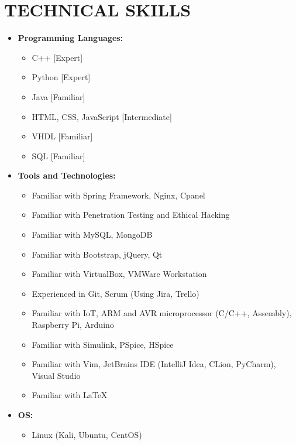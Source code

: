 \section{TECHNICAL SKILLS}
\begin{itemize}
	\item \textbf{Programming Languages:} 
		\begin{itemize}
			\item C++ [Expert]
			\item Python [Expert]
			\item Java [Familiar]
			\item HTML, CSS, JavaScript [Intermediate]
			\item VHDL [Familiar]
			\item SQL [Familiar]
		\end{itemize}
	
	\vspace{+1 em}
	\item \textbf{Tools and Technologies:} 
		\begin{itemize}
			\item Familiar with Spring Framework, Nginx, Cpanel
			\item Familiar with Penetration Testing and Ethical Hacking
			\item Familiar with MySQL, MongoDB
			\item Familiar with Bootstrap, jQuery, Qt
			\item Familiar with VirtualBox, VMWare Workstation
			
			\item Experienced in Git, Scrum (Using Jira, Trello) 
			
			\item Familiar with IoT, ARM and AVR microprocessor (C/C++, Assembly), Raspberry Pi, Arduino
			\item Familiar with Simulink, PSpice, HSpice
			
			\item Familiar with Vim, JetBrains IDE (IntelliJ Idea, CLion, PyCharm), Visual Studio
			
			\item Familiar with \LaTeX
			
		\end{itemize}

	\vspace{+1 em}
	\item \textbf{OS:} 
		\begin{itemize}
			\item Linux (Kali, Ubuntu, CentOS)
		\end{itemize}
\end{itemize}

